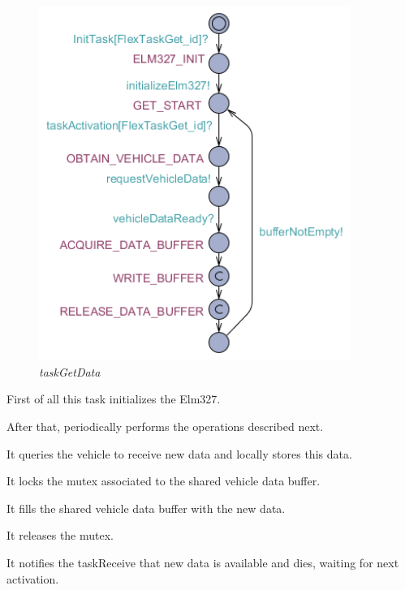\documentclass[paper=a4, fontsize=11pt]{scrartcl} %
\numberwithin{equation}{section} %
\numberwithin{figure}{section} %
\numberwithin{table}{section} %
\begin{document}
\begin{figure}[H]
  \centering
  \includegraphics[width=4in]{img/FLEX-PC_taskGetData}
  \caption{\textit{taskGetData}}
\end{figure}

First of all this task initializes the Elm327.

After that, periodically performs the operations described next.

It queries the vehicle to receive new data and locally stores this data.

It locks the mutex associated to the shared vehicle data buffer.

It fills the shared vehicle data buffer with the new data.

It releases the mutex.

It notifies the taskReceive that new data is available and dies, waiting for next activation.
\end{document}
